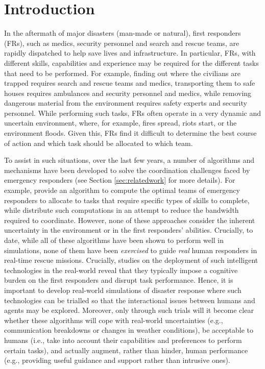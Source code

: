 \section{Introduction}
In the aftermath of major disasters (man-made or natural), first responders  (FRs), such as medics, security personnel and search and rescue teams, are  rapidly dispatched to help save lives and infrastructure. In particular, FRs, with different skills, capabilities and experience may be required for the different tasks that need to be performed.  For example, finding out where the civilians are  trapped requires search and rescue teams and medics, transporting them to safe houses  requires ambulances and security personnel and medics, while  removing dangerous material from the environment requires safety experts and security personnel. While performing such tasks, FRs often operate in a very dynamic and uncertain environment, where, for example, fires  spread, riots start, or the environment floods. Given this, FRs find it difficult to determine the best course of action and which task should be allocated to which team.

To assist in such situations, over the last few years, a number of  algorithms  and mechanisms have been developed to solve the coordination challenges faced by emergency responders  (see Section \ref{sec:relatedwork} for more details). For example, \cite{ramchurn:etal:2010} provide an algorithm to compute the optimal teams of emergency responders to allocate to tasks that require specific types of skills to complete, while \cite{Chapman2009,puyol:etal:2014} distribute such computations in an attempt to reduce the bandwidth required to coordinate. However, none of these approaches consider the inherent uncertainty in the environment or in the first responders' abilities. Crucially, to date, while all of these algorithms have been shown to perform well in simulations, none of them have been \emph{exercised} to guide \emph{real} human responders in real-time rescue missions. Crucially,  studies on the deployment of such intelligent technologies in the real-world reveal that they typically impose a cognitive burden on the first responders \cite{Rachlin1997,Moran2013} and disrupt task performance.  Hence, it is important to develop real-world simulations of disaster response where such technologies can be trialled so that  the interactional issues between humans and agents may be explored. Moreover, only through such trials will it become clear whether these algorithms will cope with real-world uncertainties (e.g., communication breakdowns or changes in weather conditions), be acceptable to humans (i.e., take into account their capabilities and preferences to perform certain tasks), and actually augment, rather than hinder,  human performance (e.g., providing useful guidance and support rather than intrusive ones). 


